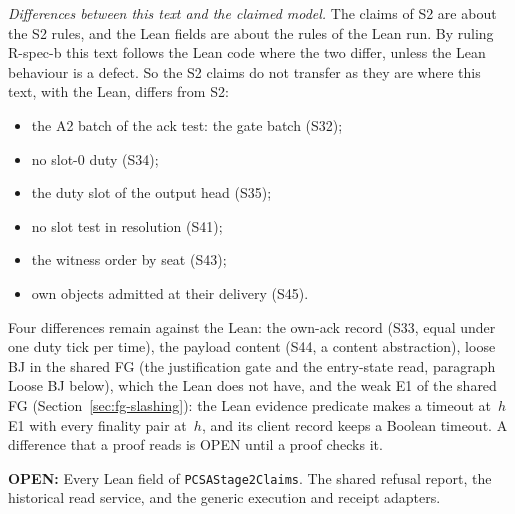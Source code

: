 \documentclass{article}
\newcommand{\OPEN}[1]{\par\noindent\textbf{OPEN:} #1\par}
\newcommand{\nm}[1]{\nolinkurl{#1}}
\begin{document}
\emph{Differences between this text and the claimed model.}  The claims of
S2 are about the S2 rules, and the Lean fields are about the rules of the
Lean run.  By ruling R-spec-b this text follows the Lean code where the
two differ, unless the Lean behaviour is a defect.  So the S2 claims do not
transfer as they are where this text, with the Lean, differs from S2:
\begin{itemize}
\item the A2 batch of the ack test: the gate batch (S32);
\item no slot-$0$ duty (S34);
\item the duty slot of the output head (S35);
\item no slot test in resolution (S41);
\item the witness order by seat (S43);
\item own objects admitted at their delivery (S45).
\end{itemize}
Four differences remain against the Lean: the own-ack record (S33,
equal under one duty tick per time), the payload content (S44, a content
abstraction), loose BJ in the shared FG (the justification gate and
the entry-state read, paragraph Loose BJ below), which the Lean does not
have, and the weak E1 of the shared FG (Section~\ref{sec:fg-slashing}):
the Lean evidence predicate makes a timeout at~$h$ E1 with every finality
pair at~$h$, and its client record keeps a Boolean timeout.  A
difference that a proof reads is OPEN until a proof checks it.

\OPEN{Every Lean field of \nm{PCSAStage2Claims}.  The shared refusal
report, the historical read service, and the generic execution and receipt
adapters.}
\end{document}

